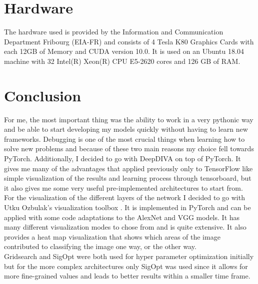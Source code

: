 \section{Hardware}

The hardware used is provided by the Information and Communication Department Fribourg (EIA-FR) and consists of 4 Tesla K80 Graphics Cards with each 12GB of Memory and CUDA version 10.0. It is used on an Ubuntu 18.04 machine with 32 Intel(R) Xeon(R) CPU E5-2620 cores and 126 GB of RAM.

\section{Conclusion}

For me, the most important thing was the ability to work in a very pythonic way and be able to start developing my models quickly without having to learn new frameworks. Debugging is one of the most crucial things when learning how to solve new problems and because of these two main reasons my choice fell towards PyTorch. Additionally, I decided to go with DeepDIVA on top of PyTorch. It gives me many of the advantages that applied previously only to TensorFlow like simple visualization of the results and learning process through tensorboard, but it also gives me some very useful pre-implemented architectures to start from. \\

For the visualization of the different layers of the network I decided to go with Utku Ozbulak's visualization toolbox \cite{viztoolbox}. It is implemented in PyTorch and can be applied with some code adaptations to the AlexNet and VGG models. It has many different visualization modes to chose from and is quite extensive. It also provides a heat map visualization that shows which areas of the image contributed to classifying the image one way, or the other way.\\

Gridsearch and SigOpt were both used for hyper parameter optimization initially but for the more complex architectures only SigOpt was used since it allows for more fine-grained values and leads to better results within a smaller time frame. \\